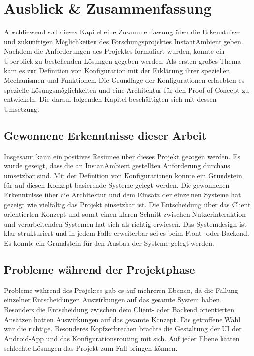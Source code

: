 \chapter{Ausblick \& Zusammenfassung}
Abschliessend soll dieses Kapitel eine Zusammenfassung über die Erkenntnisse und zukünftigen Möglichkeiten des Forschungsprojektes InstantAmbient geben. 
Nachdem die Anforderungen des Projektes formuliert wurden, konnte ein Überblick zu bestehenden Lösungen gegeben werden. Als ersten großes Thema kam es zur Definition von Konfiguration mit der Erklärung ihrer speziellen Mechanismen und Funktionen. Die Grundlage der Konfigurationen erlaubten es spezielle Lösungsmöglichkeiten und eine Architektur für den Proof of Concept zu entwickeln. Die darauf folgenden Kapitel beschäftigten sich mit dessen Umsetzung.

\section{Gewonnene Erkenntnisse dieser Arbeit}
Insgesamt kann ein positives Resümee über dieses Projekt gezogen werden. Es wurde gezeigt, dass die an InstanAmbient gestellten Anforderung durchaus umsetzbar sind. Mit der Definition von Konfigurationen konnte ein Grundstein für auf diesen Konzept basierende Systeme gelegt werden. Die gewonnenen Erkenntnisse über die Architektur und dem Einsatz der einzelnen Systeme hat gezeigt wie vielfältig das Projekt einsetzbar ist. Die Entscheidung über das Client orientierten Konzept und somit einen klaren Schnitt zwischen Nutzerinteraktion und verarbeitenden Systemen hat sich als richtig erwiesen. Das Systemdesign ist klar strukturiert und in jedem Falle erweiterbar sei es beim Front- oder Backend. Es konnte ein Grundstein für den Ausbau der Systeme gelegt werden.

\section{Probleme während der Projektphase}
Probleme während des Projektes gab es auf mehreren Ebenen, da die Fällung einzelner Entscheidungen Auswirkungen auf das gesamte System haben. Besonders die Entscheidung zwischen dem Client- oder Backend orientierten Ansätzen hatten Auswirkungen auf das gesamte Konzept. Die getroffene Wahl war die richtige. Besonderes Kopfzerbrechen brachte die Gestaltung der UI der Android-App und das Konfigurationsrouting mit sich. Auf jeder Ebene hätten schlechte Lösungen das Projekt zum Fall bringen können. 

